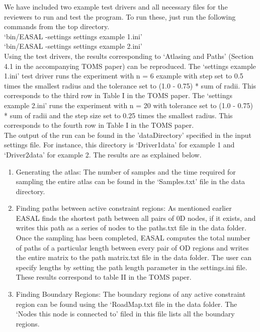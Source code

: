 \documentclass[10pt]{article}
\begin{document}
We have included two example test drivers and all necessary files for the
reviewers to run and test the program. To run these, just run the following
commands from the top directory.\\


`bin/EASAL -settings settings example 1.ini'\\


`bin/EASAL -settings settings example 2.ini'\\

Using the test drivers, the results corresponding to `Atlasing and Paths' 
(Section 4.1 in the accompanying TOMS paper) can be
reproduced. The `settings example 1.ini' test driver runs the experiment with n
= 6 example with step set to 0.5 times the smallest radius and the tolerance
set to (1.0 - 0.75) * sum of radii. This corresponds to the third row in Table
I in the TOMS paper. The `settings example 2.ini' runs the experiment with n =
20 with tolerance set to (1.0 - 0.75) * sum of radii and the step size set to
0.25 times the smallest radius. This corresponds to the fourth row in Table I
in the TOMS paper.\\ 


The output of the run can be found in the 'dataDirectory' specified in the
input settings file. For instance, this directory is `Driver1data' for example 1 
and `Driver2data' for example 2. The results are as explained below.


\begin{enumerate}
\item Generating the atlas: The number of samples and the time required for
sampling the entire atlas can be found in the `Samples.txt' file in the data
directory.

\item Finding paths between active constraint regions: As mentioned earlier
EASAL finds the shortest path between all pairs of 0D nodes, if it exists, and
writes this path as a series of nodes to the paths.txt file in the data folder.
Once the sampling has been completed, EASAL computes the total number of paths
of a particular length between every pair of OD regions and writes the entire
matrix to the path matrix.txt file in the data folder. The user can specify
lengths by setting the path length parameter in the settings.ini file. These
results correspond to table II in the TOMS paper.

\item Finding Boundary Regions: The boundary regions of any active constraint
region can be found using the `RoadMap.txt file in the data folder. The `Nodes
this node is connected to' filed in this file lists all the boundary regions.
\end{enumerate}
\end{document}
